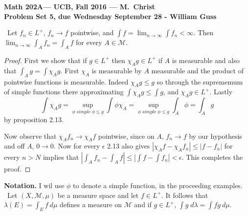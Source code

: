\documentclass[11pt]{amsart}
\theoremstyle{definition}
\numberwithin{theorem}{section}
\numberwithin{definition}{section}
\numberwithin{equation}{section}
\def\scriptm{{\mathcal M}}
\begin{document}
\begin{center}{\bf Math 202A--- UCB, Fall 2016 --- M.~Christ}
\\
{\bf Problem Set 5, due Wednesday September 28 - William Guss}
\end{center}
\medskip {}\ Let $f_n \in L^{+}$, $f_n \to f$ pointwise, and $\int f = \lim_{n \to \infty} \int f_n < \infty$. Then $\lim_{n \to \infty} \int_A f_n = \int_A f$ for every $A \in \scriptm$.
\begin{proof}
  First we show that if $g \in L^{+}$ then $\chi_{A} g \in L^{+}$ if $A$ is measurable and also that $\int_{A} g = \int \chi_{A}g$. First $\chi_A$ is measurable by $A$ measurable and the product of pointwise functions is measurable. 
  Indeed $\chi_A g \leq g$ so through the suprememum of simple functions there approximating $ \int \chi_A g \leq \int g$, and $\chi_A g \in L^+$. Lastly $$\int \chi_A g = \sup_{\phi\; simple\; \phi \leq g}\int \phi \chi_A = \sup_{\phi\; simple\; \phi \leq g} \int_{A} \phi = \int_A g$$
  by proposition 2.13.

  Now observe that $\chi_A f_n \to \chi_A f$ pointwise, since on $A$, $f_n \to f$ by our hypothesis and off $A$, $0 \to 0$. Now for every $\epsilon$ 2.13 also gives $|\chi_A f - \chi_A f_n| \leq |f - f_n| $ for every $n > N$ implies that $\left| \int_A f_n - \int_A f \right | \leq \left|\int f - \int f_n\right| < \epsilon  $. This completes the proof.

\end{proof}
\textbf{Notation.} I wil use $\phi$ to denote a simple function, in the proceeding examples. \\
\medskip {}\ Let $(X, \scriptm, \mu)$ be a measure space and let $f \in L^+$. It follows that $\lambda(E) = \int_E f\ d\mu$ defines a measure on $\scriptm$ and if $g \in L^+$, $\int g\; d\lambda = \int fg\ d\mu$.
\end{document}
